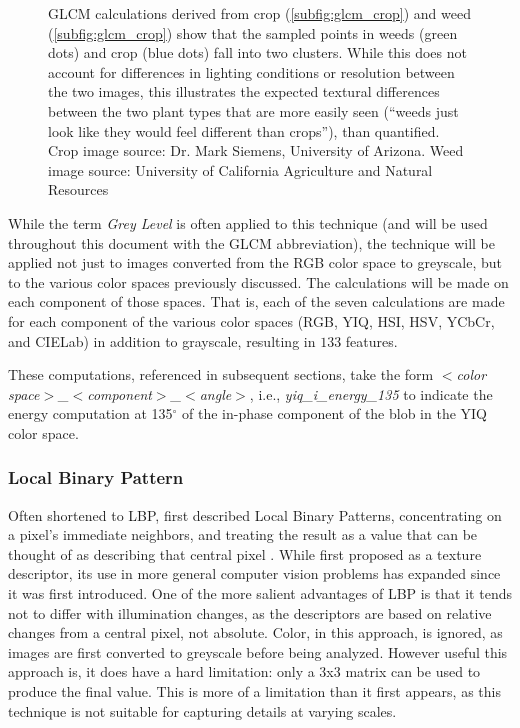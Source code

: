 \documentclass[letterpaper]{report}
\begin{document}
\begin{figure}[H]
\begin{subfigure}[h]{0.28\linewidth}
	\end{subfigure}%
	\hfill
	\caption[An example of GLCM calculations for weed and crop]{GLCM calculations derived from crop (\ref{subfig:glcm_crop}) and weed (\ref{subfig:glcm_crop}) show that the sampled points in weeds (green dots) and crop (blue dots) fall into two clusters. While this does not account for differences in lighting conditions or resolution between the two images, this illustrates the expected textural differences between the two plant types that are more easily seen (``weeds just look like they would feel different than crops''), than quantified. Crop image source: Dr. Mark Siemens, University of Arizona. Weed image source: University of California Agriculture and Natural Resources}
	\label{fig:glcm}
\end{figure}

While the term \textit{Grey Level} is often applied to this technique (and will be used throughout this document with the GLCM abbreviation), the technique will be applied not just to images converted from the RGB color space to greyscale, but to the various color spaces previously discussed. The calculations will be made on each component of those spaces.  That is, each of the seven calculations are made for each component of the various color spaces (RGB, YIQ, HSI, HSV, YCbCr, and CIELab) in addition to grayscale, resulting in  $133$ features.

These computations, referenced in subsequent sections, take the form \textit{$<$color space$>$\_$<$component$>$\_$<$angle$>$}, i.e., \textit{yiq\_i\_energy\_135} to indicate the energy computation at 135$^{\circ}$ of the in-phase component of the blob in the YIQ color space.


\subsubsection{Local Binary Pattern}
Often shortened to LBP, \citeauthor{Ojala1996-ps} first described Local Binary Patterns, concentrating on a pixel's immediate neighbors, and treating the result as a value that can be thought of as describing that central pixel \parencite{Ojala1996-ps}. While first proposed as a texture descriptor, its use in more general computer vision problems has expanded since it was first introduced. One of the more salient advantages of LBP is that it tends not to differ with illumination changes, as the descriptors are based on relative changes from a central pixel, not absolute. Color, in this approach, is ignored, as images are first converted to greyscale before being analyzed. However useful this approach is, it does have a hard limitation: only a 3x3 matrix can be used to produce the final value. This is more of a limitation than it first appears, as this technique is not suitable for capturing details at varying scales.
\end{document}
